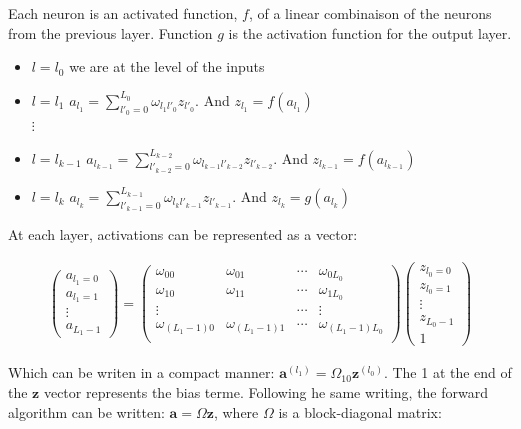 \documentclass[final, paper=letter,5p,times,twocolumn]{elsarticle}
\begin{document}
Each neuron is an activated function, $f$, of a linear combinaison of the neurons from the previous layer. Function $g$ is the activation function for the output layer.

\begin{itemize}
    \item $l = l_{0}$ we are at the level of the inputs
    \item $l = l_{1}$ $a_{l_{1}} = \sum_{l'_{0} = 0}^{L_{0}} \omega_{l_{1}l'_{0}} z_{l'_{0}}$. And $z_{l_{1}} = f(a_{l_{1}})$ \\
     $\vdots$
    \item $l = l_{k-1}$ $a_{l_{k-1}} = \sum_{l'_{k-2} = 0}^{L_{k-2}} \omega_{l_{k-1}l'_{k-2}} z_{l'_{k-2}}$. And $z_{l_{k-1}} = f(a_{l_{k-1}})$ \\ 
    \item $l = l_{k}$ $a_{l_{k}} = \sum_{l'_{k-1} = 0}^{L_{k-1}} \omega_{l_{k}l'_{k-1}} z_{l'_{k-1}}$. And $z_{l_{k}} = g(a_{l_{k}})$
\end{itemize}

At each layer, activations can be represented as a vector:

\begin{eqnarray*}
  \left(
  \begin{array}{c}
    a_{l_{1} = 0} \\
    a_{l_{1} = 1} \\
    \vdots \\
    a_{L_{1} - 1}
  \end{array}
  \right) = \left(
  \begin{array}{cccc}
    \omega_{00} & \omega_{01} & \cdots & \omega_{0L_{0}} \\
    \omega_{10} & \omega_{11} & \cdots & \omega_{1L_{0}} \\
    \vdots     &            & \cdots & \vdots \\
    \omega_{(L_{1}-1)0} & \omega_{(L_{1}-1)1} & \cdots & \omega_{(L_{1}-1)L_{0}} \\
  \end{array}
  \right)  \left(
  \begin{array}{c}
    z_{l_{0} = 0} \\
    z_{l_{0} = 1} \\
    \vdots \\
    z_{L_{0} - 1} \\
    1
  \end{array}
  \right)
\end{eqnarray*}

Which can be writen in a compact manner: $\bm{a}^{(l_{1})} = \Omega_{10}\bm{z}^{(l_{0})}$. The 1 at the end of the $\bm{z}$ vector represents the bias terme. Following he same writing, the forward algorithm can be written: $\bm{a} = \Omega\bm{z}$, where $\Omega$ is a block-diagonal matrix:
\end{document}

